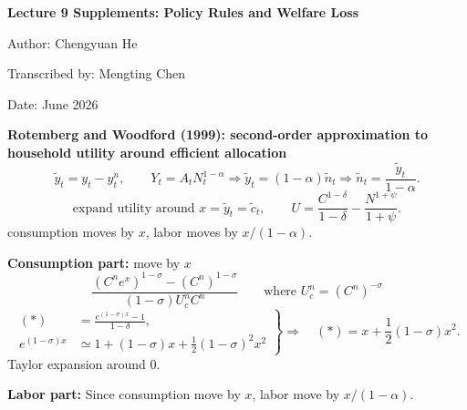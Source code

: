\documentclass[11pt,fleqn]{article}
\newcommand{\purple}[1]{\textcolor{notePurple}{#1}}
\newcommand{\purp}[1]{\purple{#1}}
\begin{document}
\begin{center}
{\Large\bfseries Lecture 9 Supplements: Policy Rules and Welfare Loss}

\vspace{0.4em}
{\normalsize Author: Chengyuan He}

{\normalsize Transcribed by: Mengting Chen}

{\normalsize Date: June 2026}
\end{center}
\vspace{-0.5em}

\vspace{0.5em}
\textbf{Rotemberg and Woodford (1999): second-order approximation to household utility around efficient allocation}
\[
\tilde y_t=y_t-y_t^n,
\qquad
Y_t=A_tN_t^{1-\alpha}\Rightarrow \tilde y_t=\left(1-\alpha\right)\tilde n_t
\Rightarrow \tilde n_t=\frac{\tilde y_t}{1-\alpha}.
\]
\[
\text{expand utility around }x=\tilde y_t=\tilde c_t,\qquad
U=\frac{C^{1-\delta}}{1-\delta}-\frac{N^{1+\psi}}{1+\psi}.
\]
\purp{consumption moves by $x$, labor moves by $x/\left(1-\alpha\right)$.}
\par\vspace{1em}
\textbf{Consumption part:} \purp{move by $x$}
\[
\frac{\left(C^ne^x\right)^{1-\sigma}-\left(C^n\right)^{1-\sigma}}{\left(1-\sigma\right)U_c^nC^n}\tag{$\ast$}
\qquad\text{where }U_c^n=\left(C^n\right)^{-\sigma}
\]
\[
\left.
\begin{aligned}
\left(\ast\right)&=\frac{e^{\left(1-\sigma\right)x}-1}{1-\delta},\\[-1pt]
 e^{\left(1-\sigma\right)x}&\simeq1+\left(1-\sigma\right)x+\frac12\left(1-\sigma\right)^2x^2
\end{aligned}\right\}
\Rightarrow\quad
\left(\ast\right)=x+\frac12\left(1-\sigma\right)x^2.
\]
\purp{Taylor expansion around $0$.}
\par\vspace{1em}
\textbf{Labor part:} Since consumption move by $x$, labor move by $x/\left(1-\alpha\right)$.
\end{document}

